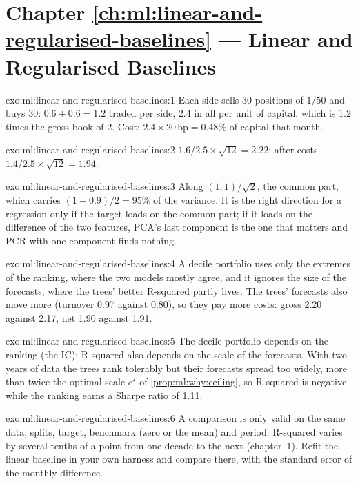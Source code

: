 \section*{Chapter \ref{ch:ml:linear-and-regularised-baselines} --- Linear and Regularised Baselines}

\begin{solution}{exo:ml:linear-and-regularised-baselines:1}
Each side sells 30 positions of $1/50$ and buys 30: $0.6 + 0.6 = 1.2$ traded per side, 2.4 in all per unit of capital,
which is 1.2 times the gross book of 2. Cost: $2.4\times20\,\text{bp} = 0.48\%$ of capital that month.
\end{solution}

\begin{solution}{exo:ml:linear-and-regularised-baselines:2}
$1.6/2.5\times\sqrt{12} = 2.22$; after costs $1.4/2.5\times\sqrt{12} = 1.94$.
\end{solution}

\begin{solution}{exo:ml:linear-and-regularised-baselines:3}
Along $(1, 1)/\sqrt2$, the common part, which carries $(1 + 0.9)/2 = 95\%$ of the variance. It is the right direction
for a regression only if the target loads on the common part; if it loads on the difference of the two features, PCA's
last component is the one that matters and PCR with one component finds nothing.
\end{solution}

\begin{solution}{exo:ml:linear-and-regularised-baselines:4}
A decile portfolio uses only the extremes of the ranking, where the two models mostly agree, and it ignores the size of
the forecasts, where the trees' better R-squared partly lives. The trees' forecasts also move more (turnover 0.97
against 0.80), so they pay more costs: gross 2.20 against 2.17, net 1.90 against 1.91.
\end{solution}

\begin{solution}{exo:ml:linear-and-regularised-baselines:5}
The decile portfolio depends on the ranking (the IC); R-squared also depends on the scale of the forecasts. With two
years of data the trees rank tolerably but their forecasts spread too widely, more than twice the optimal scale
$c^\star$ of \cref{prop:ml:why:ceiling}, so R-squared is negative while the ranking earns a Sharpe ratio of 1.11.
\end{solution}

\begin{solution}{exo:ml:linear-and-regularised-baselines:6}
A comparison is only valid on the same data, splits, target, benchmark (zero or the mean) and period: R-squared varies
by several tenths of a point from one decade to the next (chapter~1). Refit the linear baseline in your own harness and
compare there, with the standard error of the monthly difference.
\end{solution}

